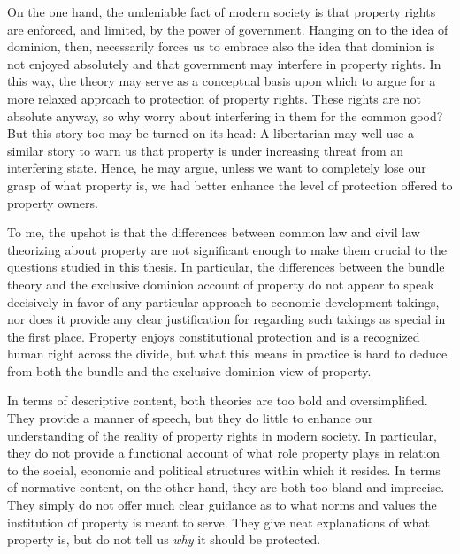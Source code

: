 On the one hand, the undeniable fact of modern society is that property rights are enforced, and limited, by the power of government. Hanging on to the idea of dominion, then, necessarily forces us to embrace also the idea that dominion is not enjoyed absolutely and that government may interfere in property rights. In this way, the theory may serve as a conceptual basis upon which to argue for a more relaxed approach to protection of property rights. These rights are not absolute anyway, so why worry about interfering in them for the common good? But this story too may be turned on its head: A libertarian may well use a similar story to warn us that property is under increasing threat from an interfering state. Hence, he may argue, unless we want to completely lose our grasp of what property is, we had better enhance the level of protection offered to property owners.

To me, the upshot is that the differences between common law and civil law theorizing about property are not significant enough to 
make them crucial to the questions studied in this thesis. In particular, the differences between the bundle theory and the exclusive dominion account of property do not appear to speak decisively in favor of any particular approach to economic development takings, nor does it provide any clear justification for regarding such takings as special in the first place. Property enjoys constitutional protection and is a recognized human right across the divide, but what this means in practice is hard to deduce from both the bundle and the exclusive dominion view of property. 

In terms of descriptive content, both theories are too bold and oversimplified. They provide a manner of speech, but they do little to enhance our understanding of the reality of property rights in modern society. In particular, they do not provide a functional account of what role property plays in relation to the social, economic and political structures within which it resides. In terms of normative content, on the other hand, they are both too bland and imprecise. They simply do not offer much clear guidance as to what norms and values the institution of property is meant to serve. They give neat explanations of what property is, but do not tell us {\it why} it should be protected. 

